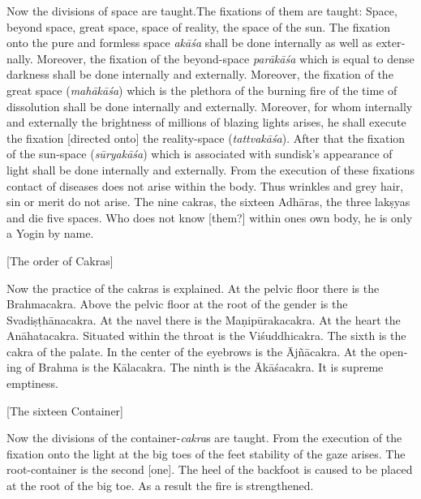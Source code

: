 \begin{otherlanguage}{english}
\begin{tlate}
 Now the divisions of space are taught.The fixations of them are taught: Space, beyond space, great space, space of reality, the space of the sun. The fixation onto the pure and formless space \textit{akāśa} shall be done internally as well as externally. Moreover, the fixation of the beyond-space \textit{parākāśa} which is equal to dense darkness shall be done internally and externally. Moreover, the fixation of the great space (\textit{mahākāśa}) which is the plethora of the burning fire of the time of dissolution shall be done internally and externally. Moreover, for whom internally and externally the brightness of millions of blazing lights arises, he shall execute the fixation [directed onto] the reality-space (\textit{tattvakāśa}). After that the fixation of the sun-space (\textit{sūryakāśa}) which is associated with sundisk's appearance of light shall be done internally and externally. From the execution of these fixations contact of diseases does not arise within the body. Thus wrinkles and grey hair, sin or merit do not arise. The nine cakras, the sixteen Adhāras, the three lakṣyas and die five spaces. Who does not know [them?] within ones own body, he is only a Yogin by name.
\end{tlate}
\begin{tlate}
 \bigskip
 \centerline{\textrm{\small{[The order of Cakras]}}}
 \bigskip
Now the practice of the cakras is explained. At the pelvic floor there is the Brahmacakra. Above the pelvic floor at the root of the gender is the Svadiṣṭhānacakra. At the navel there is the Maṇipūrakacakra. At the heart the Anāhatacakra. Situated within the throat is the Viśuddhicakra. The sixth is the cakra of the palate. In the center of the eyebrows is the Ājñācakra. At the opening of Brahma is the Kālacakra. The ninth is the Ākāśacakra. It is supreme emptiness.
\end{tlate}
\begin{tlate}
 \bigskip
 \centerline{\textrm{\small{[The sixteen Container]}}}
 \bigskip
 Now the  divisions of the container-\textit{cakra}s are taught.
 From the execution of the fixation onto the light at the big toes of the feet stability of the gaze arises.
 The root-container is the second [one]. The heel of the backfoot is caused to be placed at the root of the big toe. As a result the fire is strengthened.

\end{tlate}
\end{otherlanguage}
